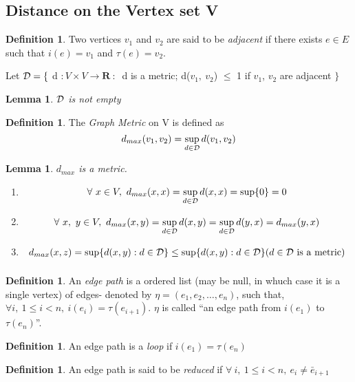 \documentclass[a4paper,10pt]{book}
\newtheorem{lemma}[theorem]{Lemma}
\theoremstyle{definition}
\newtheorem{definition}[theorem]{Definition}
\theoremstyle{remark}
\numberwithin{section}{chapter}
\numberwithin{equation}{chapter}
\begin{document}
   \subsection{Distance on the Vertex set V}
   \begin{definition}
      Two vertices $ v_{1}$ and $v_{2} $ are said to be \emph{adjacent} if there exists $ e \in E $ such that $ i(e) = v_1 $ and $ \tau (e) = v_2 $.
   \end{definition}
   Let $ \cal{D} = \{ $ d $: V \times V \rightarrow \mathbf{R} \ : \ $ 
 d is a metric; d($ v_1,\ v_2 $) $ \leq $ 1 if $ v_1 $, $ v_2 $ are adjacent $ \} $
   \begin{lemma}
      $ \cal{D} $ is not empty
   \end{lemma}
   \begin{definition}
      The \emph{Graph Metric} on V is defined as
      \begin{equation}
	  d_{max}(v_1,v_2)= \sup_{d \in \cal{D} }d(v_1,v_2) \nonumber
      \end{equation} 
   \end{definition}
   \begin{lemma}
	$ d_{max} $ is a metric.
    \proof 
    \begin{enumerate}
      \item \[\forall \ x \in V,\ d_{max}(x, x)= \sup_{d \in \cal{D}}d(x,x) = \sup\{ 0 \} = 0 \]
      \item \[\forall \ x,\ y \in V,\ d_{max}(x, y)= \sup_{d \in \cal{D} }d(x,y)= \sup_{d \in \cal{D} }d(y,x)  =d _{max}(y, x) \]
      \item \[ d_{max}(x, z)=\sup\{d(x,y): d \in \mathcal{D}\} \leq \sup_{}\{ d(x,y): d \in \mathcal{D}\} {( d \in \cal{D} \text{ is a metric})} \]
    \end{enumerate}    
  \end{lemma}
  \begin{definition}
   An \emph{edge path} is a ordered list (may be null, in whuch case it is a single vertex) of edges- denoted by $ \eta=(e_1,e_2,\dots,e_n) $, such that, $ \forall i,\ 1\leq i < n,\ i(e_i)=\tau(e_{i+1})$. $\eta$ is called ``an edge path from $i(e_1)$ to $\tau(e_n)$''.
  \end{definition}
  \begin{definition}
   An edge path is a \emph{loop} if $i(e_1) = \tau(e_n)$ 
  \end{definition}
  \begin{definition}
   An edge path is said to be \emph{reduced} if $\forall\ i,\ 1\leq i<n,\ e_i \neq \bar{e}_{i+1}$
  \end{definition}
\end{document}
